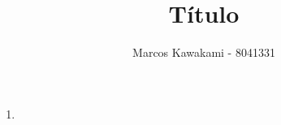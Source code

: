 \documentclass[a4paper]{article}
\title{Título} %
\author{Marcos Kawakami - 8041331} %
\date{} %
\begin{document}
\maketitle %


\begin{enumerate}[label=\textbf{\arabic*}.]
\item
\end{enumerate}
\end{document}
